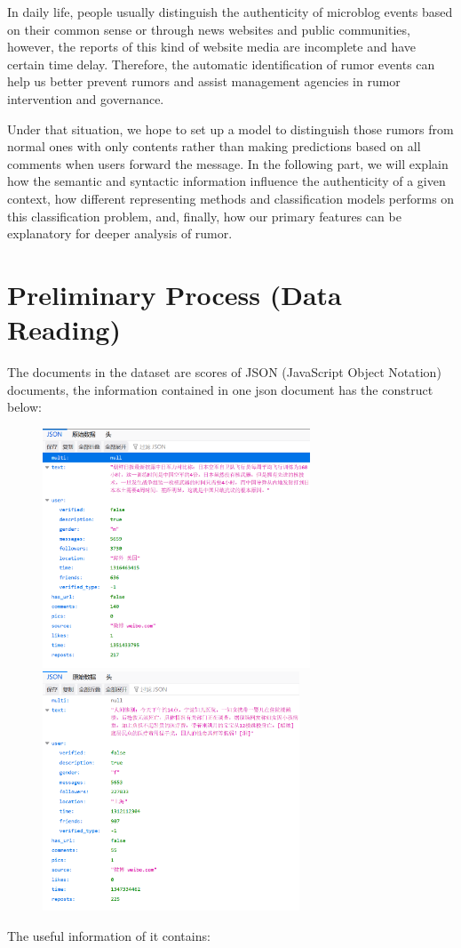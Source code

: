 \documentclass[12pt,a4paper]{article}
\begin{document}
In daily life, people usually distinguish the authenticity of microblog events based on their common sense or through news websites and public communities, however, the reports of this kind of website media are incomplete and have certain time delay. Therefore, the automatic identification of rumor events can help us better prevent rumors and assist management agencies in rumor intervention and governance.

Under that situation, we hope to set up a model to distinguish those rumors from normal ones with only contents rather than making predictions based on all comments when users forward the message. In the following part, we will explain how the semantic and syntactic information influence the authenticity of a given context, how different representing methods and classification models performs on this classification problem, and, finally, how our primary features can be explanatory for deeper analysis of rumor.

\section{Preliminary Process (Data Reading)}
The documents in the dataset are scores of JSON (JavaScript Object Notation) documents, the information contained in one json document has the construct below:

\begin{figure}[htbp]
	\centering
	\begin{minipage}{0.49\linewidth}
		\includegraphics[height=2.8in]{pic/example}
	\end{minipage}
\hfil
	\begin{minipage}{0.49\linewidth}
		\includegraphics[height=2.8in]{pic/example2}
	\end{minipage}
\end{figure}
\clearpage
The useful information of it contains:
\end{document}
